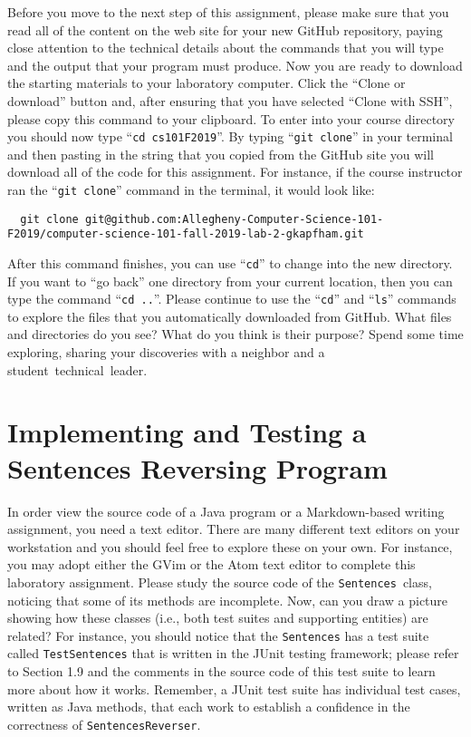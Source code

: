 \documentclass[11pt]{article}
\newcommand{\mainprogram}{\lstinline{SentencesReverser}}
\newcommand{\mainprogramhelper}{\lstinline{Sentences}}
\newcommand{\testprogram}{\lstinline{TestSentences}}
\newcommand{\command}[1]{``\lstinline{#1}''}
\newcommand{\step}[1]{``{#1}''}
\begin{document}
Before you move to the next step of this assignment, please make sure that you
read all of the content on the web site for your new GitHub repository, paying
close attention to the technical details about the commands that you will type
and the output that your program must produce. Now you are ready to download the
starting materials to your laboratory computer. Click the ``Clone or download''
button and, after ensuring that you have selected ``Clone with SSH'', please
copy this command to your clipboard. To enter into your course directory you
should now type \command{cd cs101F2019}. By typing \command{git clone} in your
terminal and then pasting in the string that you copied from the GitHub site you
will download all of the code for this assignment. For instance, if the course
instructor ran the \command{git clone} command in the terminal, it would look
like:

\begin{lstlisting}
  git clone git@github.com:Allegheny-Computer-Science-101-F2019/computer-science-101-fall-2019-lab-2-gkapfham.git
\end{lstlisting}

After this command finishes, you can use \command{cd} to change into the new
directory. If you want to \step{go back} one directory from your current
location, then you can type the command \command{cd ..}. Please continue to use
the \command{cd} and \command{ls} commands to explore the files that you
automatically downloaded from GitHub. What files and directories do you see?
What do you think is their purpose? Spend some time exploring, sharing your
discoveries with a neighbor and a \mbox{student technical leader}.

\section*{Implementing and Testing a Sentences Reversing Program}

In order view the source code of a Java program or a Markdown-based writing
assignment, you need a text editor. There are many different text editors on
your workstation and you should feel free to explore these on your own. For
instance, you may adopt either the GVim or the Atom text editor to complete
this laboratory assignment. Please study the source code of the
\mainprogramhelper~class, noticing that some of its methods are incomplete.
Now, can you draw a picture showing how these classes (i.e., both test suites
and supporting entities) are related? For instance, you should notice that the
\mainprogramhelper{} has a test suite called \testprogram{} that is written in
the JUnit testing framework; please refer to Section 1.9 and the comments in
the source code of this test suite to learn more about how it works. Remember,
a JUnit test suite has individual test cases, written as Java methods, that
each work to establish a confidence in the correctness of \mainprogram{}.
\end{document}
